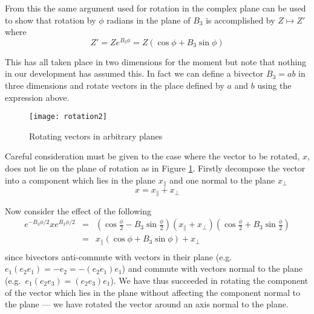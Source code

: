 From this the same argument used for rotation in the complex plane 
can be used to show that rotation by
$\phi$ radians in the plane of $B_3$ is accomplished by $Z \mapsto Z'$
where
\begin{displaymath}
Z' = Ze^{B_3\phi} = Z (\cos \phi + B_3 \sin \phi)
\end{displaymath}

This has all taken place in two dimensions for the moment but note that nothing
in our development has assumed this. In fact we can define a bivector $B_3 = ab$ in
three dimensions and rotate vectors in the place defined by $a$ and $b$ using
the expression above.

\begin{figure}
\centering
\texttt{[image: rotation2]}
\caption{Rotating vectors in arbitrary planes\label{fig:rotation2}}
\end{figure}

Careful consideration must be given to the case where the vector to be
rotated, $x$, does not lie on the plane of rotation as in Figure
\ref{fig:rotation2}. Firstly decompose the
vector into a component which lies in the plane $x_\parallel$ and one
normal to the plane $x_\perp$
\[
x = x_\parallel + x_\perp
\]

Now consider the effect of the following
\begin{eqnarray*}
e^{-B_3\phi/2}
x
e^{B_3\phi/2}
& = & \left(\cos \frac{\phi}{2} - B_3 \sin \frac{\phi}{2}\right)
(x_\parallel + x_\perp )
\left(\cos \frac{\phi}{2} + B_3 \sin \frac{\phi}{2}\right) \\
& = & x_\parallel (\cos \phi + B_3 \sin \phi) + x_\perp\\ 
\end{eqnarray*}
since bivectors anti-commute with vectors in their plane (e.g. 
$e_1(e_2e_1) = -e_2 = -(e_2e_1)e_1$) and commute with
vectors normal to the plane (e.g.\ $e_1(e_2e_3) = (e_2e_3)e_1$).
We have thus succeeded in rotating the component of the vector 
which lies in the plane without affecting the component normal
to the plane --- we have rotated the vector around an axis normal to
the plane.


